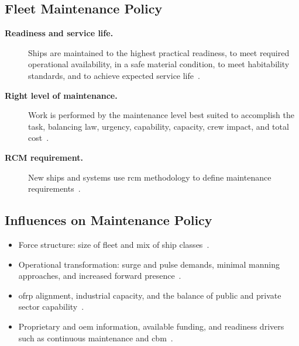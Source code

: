 \documentclass[../main.tex]{subfiles}
\begin{document}
\subsection{Fleet Maintenance Policy}
\begin{description}
  \item[\textbf{Readiness and service life.}] Ships are maintained to the highest practical readiness, to meet required operational availability, in a safe material condition, to meet habitability standards, and to achieve expected service life~\autocite{OPNAVINST4700-7N,edo-4-1-3-fleet-maint-policy-2025}.
  \item[\textbf{Right level of maintenance.}] Work is performed by the maintenance level best suited to accomplish the task, balancing law, urgency, capability, capacity, crew impact, and total cost~\autocite{OPNAVINST4700-7N,USC-10-2466,edo-4-1-3-fleet-maint-policy-2025}.
  \item[\textbf{RCM requirement.}] New ships and systems use \ac{rcm} methodology to define maintenance requirements~\autocite{OPNAVINST4700-7N,edo-4-1-3-fleet-maint-policy-2025}.
\end{description}

\subsection{Influences on Maintenance Policy}
\begin{itemize}
  \item Force structure: size of fleet and mix of ship classes~\autocite{edo-4-1-3-fleet-maint-policy-2025}.
  \item Operational transformation: surge and pulse demands, minimal manning approaches, and increased forward presence~\autocite{edo-4-1-3-fleet-maint-policy-2025}.
  \item \ac{ofrp} alignment, industrial capacity, and the balance of public and private sector capability~\autocite{edo-4-1-3-fleet-maint-policy-2025}.
  \item Proprietary and \ac{oem} information, available funding, and readiness drivers such as continuous maintenance and \ac{cbm}~\autocite{edo-4-1-3-fleet-maint-policy-2025}.
\end{itemize}
\end{document}
